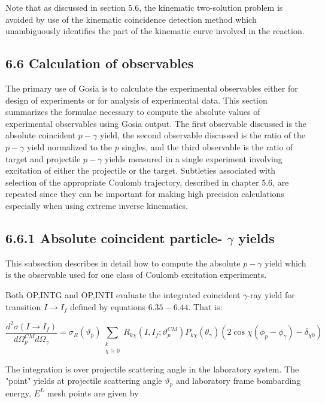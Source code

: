 \documentclass[10pt]{article}
\begin{document}
Note that as discussed in section 5.6, the kinematic two-solution problem is avoided by use of the kinematic coincidence detection method which unambiguously identifies the part of the kinematic curve involved in the reaction.

\subsection*{6.6 Calculation of observables}
The primary use of Gosia is to calculate the experimental observables either for design of experiments or for analysis of experimental data. This section summarizes the formulae necessary to compute the absolute values of experimental observables using Gosia output. The first observable discussed is the absolute coincident $p-\gamma$ yield, the second observable discussed is the ratio of the $p-\gamma$ yield normalized to the $p$ singles, and the third observable is the ratio of target and projectile $p-\gamma$ yields measured in a single experiment involving excitation of either the projectile or the target. Subtleties associated with selection of the appropriate Coulomb trajectory, described in chapter 5.6, are repeated since they can be important for making high precision calculations especially when using extreme inverse kinematics.

\subsection*{6.6.1 Absolute coincident particle- $\gamma$ yields}
This subsection describes in detail how to compute the absolute $p-\gamma$ yield which is the observable used for one class of Coulomb excitation experiments.

Both OP,INTG and OP,INTI evaluate the integrated coincident $\gamma$-ray yield for transition $I \rightarrow I_{f}$ defined by equations $6.35-6.44$. That is:


\begin{equation*}
\frac{d^{2} \sigma\left(I \rightarrow I_{f}\right)}{d \Omega_{p}^{C M} d \Omega_{\gamma}}=\sigma_{R}\left(\vartheta_{p}\right) \sum_{\substack{k \\ \chi \geq 0}} R_{k \chi}\left(I, I_{f} ; \vartheta_{p}^{C M}\right) P_{k \chi}\left(\theta_{\gamma}\right)\left(2 \cos \chi\left(\phi_{p}-\phi_{\gamma}\right)-\delta_{\chi 0}\right) \tag{6.35}
\end{equation*}


The integration is over projectile scattering angle in the laboratory system. The "point" yields at projectile scattering angle $\vartheta_{p}$ and laboratory frame bombarding energy, $E^{L}$ mesh points are given by
\end{document}
